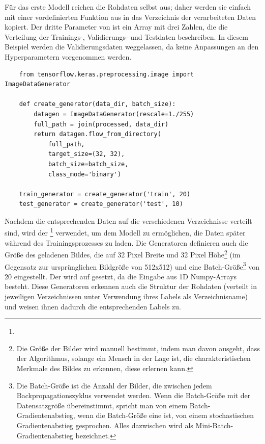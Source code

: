 Für das erste Modell reichen die Rohdaten selbst aus; daher werden sie einfach mit einer vordefinierten Funktion  aus  in das Verzeichnis der verarbeiteten Daten kopiert.
Der dritte Parameter von  ist ein Array mit drei Zahlen, die die Verteilung der Trainings-, Validierungs- und Testdaten beschreiben.
In diesem Beispiel werden die Validierungsdaten weggelassen, da keine Anpassungen an den Hyperparametern vorgenommen werden.

\begin{lstlisting}
    from tensorflow.keras.preprocessing.image import ImageDataGenerator
    
    def create_generator(data_dir, batch_size):
        datagen = ImageDataGenerator(rescale=1./255)
        full_path = join(processed, data_dir)
        return datagen.flow_from_directory(
            full_path,
            target_size=(32, 32),
            batch_size=batch_size,
            class_mode='binary')
    
    train_generator = create_generator('train', 20)
    test_generator = create_generator('test', 10)
\end{lstlisting}

Nachdem die entsprechenden Daten auf die verschiedenen Verzeichnisse verteilt sind, wird der \footnote{} verwendet, um dem Modell zu ermöglichen, die Daten später während des Trainingsprozesses zu laden.
Die Generatoren definieren auch die Größe des geladenen Bildes, die auf 32 Pixel Breite und 32 Pixel Höhe\footnote{Die Größe der Bilder wird manuell bestimmt, indem man davon ausgeht, dass der Algorithmus, solange ein Mensch in der Lage ist, die charakteristischen Merkmale des Bildes zu erkennen, diese erlernen kann.} (im Gegensatz zur ursprünglichen Bildgröße von 512x512) und eine Batch-Größe\footnote{Die Batch-Größe ist die Anzahl der Bilder, die zwischen jedem Backpropagationszyklus verwendet werden.
Wenn die Batch-Größe mit der Datensatzgröße übereinstimmt, spricht man von einem Batch-Gradientenabstieg, wenn die Batch-Größe eine ist, von einem stochastischen Gradientenabstieg gesprochen.
Alles dazwischen wird als Mini-Batch-Gradientenabstieg bezeichnet.} von 20 eingestellt.
Der  wird auf  gesetzt, da die Eingabe aus 1D Numpy-Arrays besteht.
Diese Generatoren erkennen auch die Struktur der Rohdaten (verteilt in jeweiligen Verzeichnissen unter Verwendung ihres Labels als Verzeichnisname) und weisen ihnen dadurch die entsprechenden Labels zu.

